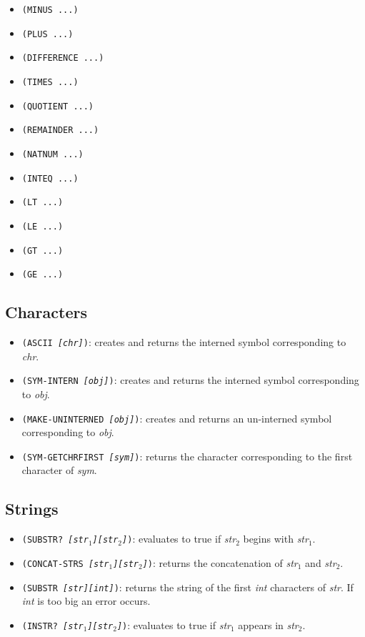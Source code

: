 \begin{itemize}
	\item {\tt (MINUS ...)}
	\item {\tt (PLUS ...)}
	\item {\tt (DIFFERENCE ...)}
	\item {\tt (TIMES ...)}
	\item {\tt (QUOTIENT ...)}
	\item {\tt (REMAINDER ...)}
	\item {\tt (NATNUM ...)}
	\item {\tt (INTEQ ...)}
	\item {\tt (LT ...)}
	\item {\tt (LE ...)}
	\item {\tt (GT ...)}
	\item {\tt (GE ...)}
\end{itemize}


\subsection{Characters}

\begin{itemize}
	\item {\tt (ASCII {\it [chr]})}:
		  creates and returns the interned symbol corresponding to {\it chr}.
	\item {\tt (SYM-INTERN {\it [obj]})}:
		   creates and returns the interned symbol corresponding to {\it obj}.
	\item {\tt (MAKE-UNINTERNED {\it [obj]})}:
		   creates and returns an un-interned symbol corresponding to {\it obj}.
	\item {\tt (SYM-GETCHRFIRST {\it [sym]})}:
		   returns the character corresponding to the first character of
		   {\it sym}.
\end{itemize}


\subsection{Strings}

\begin{itemize}
	\item {\tt (SUBSTR? {\it [str$_1$][str$_2$]})}:
		   evaluates to true if {\it str$_2$} begins with {\it str$_1$}.
	\item {\tt (CONCAT-STRS {\it [str$_1$][str$_2$]})}:
		  returns the concatenation of {\it str$_1$} and {\it str$_2$}.
	\item {\tt (SUBSTR {\it [str][int]})}:
		   returns the string of the first {\it int} characters of {\it str}. If
		   {\it int} is too big an error occurs.
	\item {\tt (INSTR? {\it [str$_1$][str$_2$]})}:
		   evaluates to true if {\it str$_1$} appears in {\it str$_2$}.
\end{itemize}


